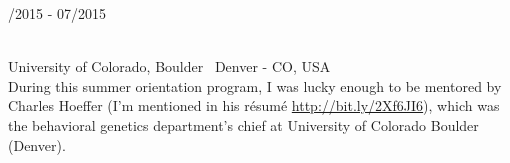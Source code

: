 \begin{minipage}{.3\textwidth}
	/2015 - 07/2015 \faCalendar
\end{minipage}
\hfill
\begin{minipage}{.65\textwidth}
	\vfill
	 \\
	\color{Maroon} University of Colorado, Boulder \color{Sepia} \hfill \faMapMarker \ Denver - CO, USA
	\smallskip
	\\
	\color{gray} During this summer orientation program, I was lucky enough to be mentored by Charles Hoeffer (I'm mentioned in his résumé \url{http://bit.ly/2Xf6JI6}), which was the behavioral genetics department's chief at University of Colorado Boulder (Denver).
	\vfill
\end{minipage}